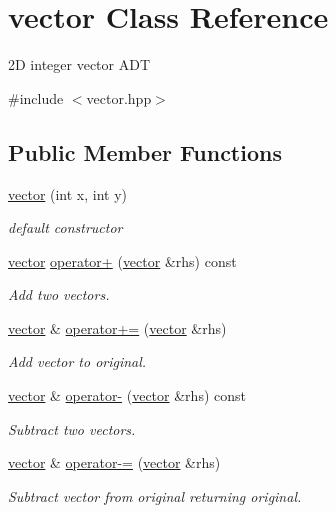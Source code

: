 \hypertarget{classvector}{}\section{vector Class Reference}
\label{classvector}


2D integer vector A\+DT  




{\ttfamily \#include $<$vector.\+hpp$>$}

\subsection*{Public Member Functions}
\begin{DoxyCompactItemize}
\item 
\hyperlink{classvector_a7fa147d3199381b9d8b32753bd1a6968}{vector} (int x, int y)
\begin{DoxyCompactList}\small\item\em default constructor \end{DoxyCompactList}\item 
\hyperlink{classvector}{vector} \hyperlink{classvector_a4ad9ccd38efea1ccba84e7666013532a}{operator+} (\hyperlink{classvector}{vector} \&rhs) const 
\begin{DoxyCompactList}\small\item\em Add two vectors. \end{DoxyCompactList}\item 
\hyperlink{classvector}{vector} \& \hyperlink{classvector_a9972b9662ea23331b1f8faab37e99c45}{operator+=} (\hyperlink{classvector}{vector} \&rhs)
\begin{DoxyCompactList}\small\item\em Add vector to original. \end{DoxyCompactList}\item 
\hyperlink{classvector}{vector} \& \hyperlink{classvector_a38d446ea9c634c06feeee946ebd61da8}{operator-\/} (\hyperlink{classvector}{vector} \&rhs) const 
\begin{DoxyCompactList}\small\item\em Subtract two vectors. \end{DoxyCompactList}\item 
\hyperlink{classvector}{vector} \& \hyperlink{classvector_a8817a31fd651ccab5601ec6c98839a56}{operator-\/=} (\hyperlink{classvector}{vector} \&rhs)
\begin{DoxyCompactList}\small\item\em Subtract vector from original returning original. \end{DoxyCompactList}\item 

\end{DoxyCompactItemize}
